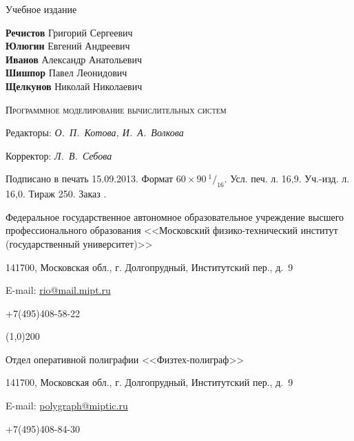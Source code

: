 
\thispagestyle{empty}
\begingroup
\small
\parindent=0pt %

\begin{center}

\begin{normalsize}
\textsf{Учебное издание}
\end{normalsize}

\vfill

\begin{normalsize}
\textbf{Речистов} Григорий Сергеевич\\
\textbf{Юлюгин} Евгений Андреевич\\
\textbf{Иванов} Александр Анатольевич\\
\textbf{Шишпор} Павел Леонидович\\
\textbf{Щелкунов} Николай Николаевич\\

\end{normalsize}

\vfill

\begin{large}
\textsc{
Программное моделирование вычислительных систем
}
\end{large}
\end{center}

\vfill

Редакторы: \textit{О.~П.~Котова, И.~А.~Волкова}

Корректор: \textit{ Л.~В.~Себова}

\medskip

Подписано в печать 15.09.2013. Формат $60 \times 90\ {^1}/_{16}$. Усл. печ. л. 16,9. Уч.-изд. л. 16,0. Тираж 250. Заказ .

Федеральное государственное автономное образовательное учреждение высшего профессионального образования <<Московский физико-тех\-ни\-чес\-кий институт (госу\-дар\-ствен\-ный университет)>>

141700, Московская обл., г. Долгопрудный, Институтский пер., д.~9

E-mail: \href{mailto:rio@mail.mipt.ru}{rio@mail.mipt.ru}

+7(495)408-58-22

\line(1,0){200}

Отдел оперативной полиграфии <<Физтех-полиграф>>

141700, Московская обл., г. Долгопрудный, Институтский пер., д.~9

E-mail: \href{mailto:polygraph@miptic.ru}{polygraph@miptic.ru}

+7(495)408-84-30
\endgroup
{}\label{page:lastpage}